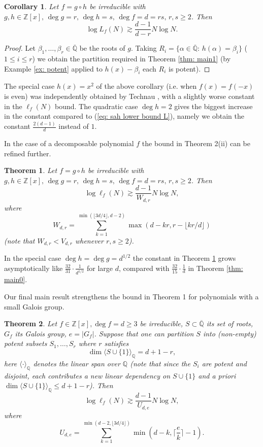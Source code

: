 \documentclass[alphabetic]{amsart}
\newtheorem{thm}{Theorem}
\newtheorem{cor}[claim]{Corollary}
\theoremstyle{definition}
\numberwithin{equation}{section}
\newcommand{\Z}{{\mathbb Z}}
\newcommand{\Q}{{\mathbb Q}}
\newcommand{\Qb}{{\overline{\Q}}}
\numberwithin{equation}{section}
\begin{document}
\begin{cor}\label{cor: main1}
Let $f=g\circ h$ be irreducible with $g,h\in\Z[x],\,\deg g=r,\,\deg h=s,\,\deg f=d=rs,\,r,s\ge 2$. Then
$$\log L_f(N)\gtrsim \frac{d-1}{d-r}N\log N.$$

\end{cor}

\begin{proof} Let $\beta_1,\ldots,\beta_r\in\overline\Q$ be the roots of $g$. Taking $R_i=\{\alpha\in\Qb:\,h(\alpha)=\beta_i\}$ ($1\le i\le r$) we obtain the partition required in Theorem \ref{thm: main1} (by Example \ref{ex: potent} applied to $h(x)-\beta_i$ each $R_i$ is potent).
\end{proof}

The special case $h(x)=x^2$ of the above corollary (i.e. when $f(x)=f(-x)$ is even) was independently obtained by Technau \cite{Tec24_1}, with a slightly worse constant in the $\ell_f(N)$ bound. The quadratic case $\deg h=2$ gives the biggest increase in the constant compared to (\ref{eq: sah lower bound L}), namely we obtain the constant $\frac{2(d-1)}d$ instead of $1$.

In the case of a decomposable polynomial $f$ the bound in Theorem 2(ii) can be refined further.

\begin{thm}\label{thm: dec l}
Let $f=g\circ h$ be irreducible with $g,h\in\Z[x],\,\deg g=r,\,\deg h=s,\,\deg f=d=rs,\,r,s\ge 2$. Then
$$\log\ell_f(N)\gtrsim\frac{d-1}{W_{d,r}}N\log N,$$
where
\begin{equation}\label{eq: Wdr} W_{d,r}=\sum_{k=1}^{\min(\lfloor 3d/4\rfloor,d-2)}\max(d-kr,r-\lfloor kr/d\rfloor )\end{equation}
(note that $W_{d,r}<V_{d,r}$ whenever $r,s\ge 2$).
\end{thm}

In the special case $\deg h=\deg g=d^{1/2}$ the constant in Theorem \ref{thm: dec l} grows asymptotically like $\frac{32}{31}\cdot \frac 1{d^{1/2}}$ for large $d$, compared with $\frac{32}{15}\cdot \frac 1d$ in Theorem \ref{thm: main0}.


Our final main result strengthens the bound in Theorem 1 for polynomials with a small Galois group.

\begin{thm}\label{thm: main2}
Let $f\in\Z[x],\deg f=d\ge 3$ be irreducible, $S\subset\overline\Q$ its set of roots, $G_f$ its Galois group, $e=|G_f|$. Suppose that one can partition $S$ into (non-empty) potent subsets $S_1,\ldots,S_r$ where $r$ satisfies $$\dim\langle S\cup\{1\}\rangle_\Q=d+1-r,$$ here $\langle\cdot\rangle_\Q$ denotes the linear span over $\Q$ (note that since the $S_i$ are potent and disjoint, each contributes a new linear dependency on $S\cup\{1\}$ and a priori $\dim\langle S\cup\{1\}\rangle_\Q\le d+1-r$).
Then $$\log\ell_f(N)\gtrsim \frac {d-1}{U_{d,e}}N\log N,$$
where \begin{equation}\label{eq: def U_e}U_{d,e}=\sum_{k=1}^{\min(d-2,\lfloor 3d/4\rfloor)}\min \left(d-k,\bigg\lceil\frac {e}k\bigg\rceil-1\right).\end{equation}
\end{thm}
\end{document}
